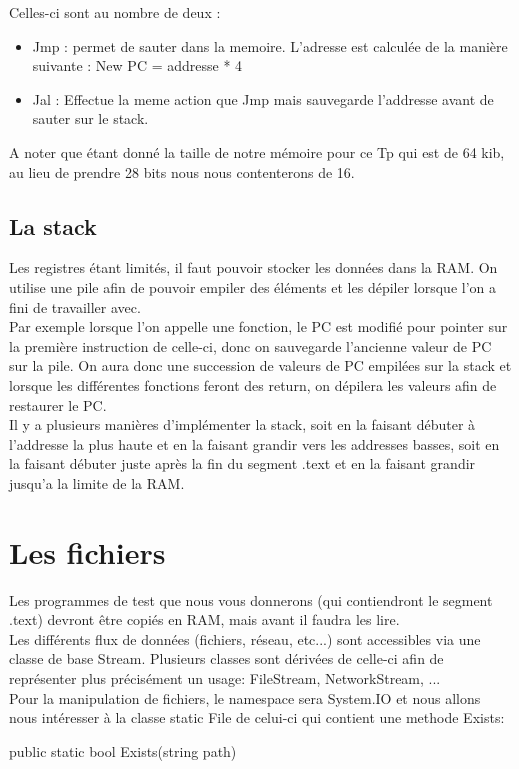 Celles-ci sont au nombre de deux :
\begin{itemize}
  \item Jmp : permet de sauter dans la memoire. L'adresse est calculée de la
    manière suivante : New PC = addresse * 4
  \item Jal : Effectue la meme action que Jmp mais sauvegarde l'addresse avant
    de sauter sur le stack.
\end{itemize}

A noter que étant donné la taille de notre mémoire pour ce Tp qui est de 64 kib,
au lieu de prendre 28 bits nous nous contenterons de 16.


\subsection{La stack}
Les registres étant limités, il faut pouvoir stocker les données dans la RAM. On
utilise une pile afin de pouvoir empiler des éléments et les dépiler lorsque
l'on a fini de travailler avec.\\ Par exemple lorsque l'on appelle une fonction,
le PC est modifié pour pointer sur la première instruction de celle-ci, donc on
sauvegarde l'ancienne valeur de PC sur la pile. On aura donc une succession de
valeurs de PC empilées sur la stack et lorsque les différentes fonctions feront
des return, on dépilera les valeurs afin de restaurer le PC.\\ Il y a plusieurs
manières d'implémenter la stack, soit en la faisant débuter à l'addresse la plus
haute et en la faisant grandir vers les addresses basses, soit en la faisant
débuter juste après la fin du segment .text et en la faisant grandir jusqu'a la
limite de la RAM.

\section {Les fichiers} Les programmes de test que nous vous donnerons (qui
contiendront le segment .text) devront être copiés en RAM, mais avant il faudra
les lire.\\ Les différents flux de données (fichiers, réseau, etc...) sont
accessibles via une classe de base Stream. Plusieurs classes sont dérivées de
celle-ci afin de représenter plus précisément un usage: FileStream,
NetworkStream, ...\\ Pour la manipulation de fichiers, le namespace sera
System.IO et nous allons nous intéresser à la classe static File de celui-ci qui
contient une methode Exists:
\begin{code}
  public static bool Exists(string path)
\end{code}

